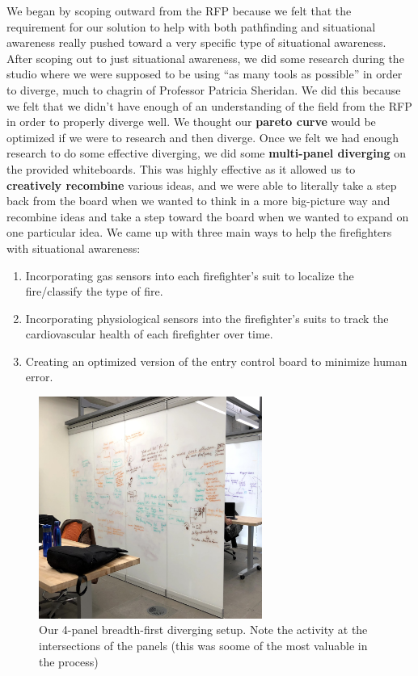\documentclass[a4paper,12pt]{article}
\begin{document}
We began by scoping outward from the RFP because we felt that the requirement for our solution to help with both pathfinding and situational awareness really pushed toward a very specific type of situational awareness. After scoping out to just situational awareness, we did some research during the studio where we were supposed to be using “as many tools as possible” in order to diverge, much to chagrin of Professor Patricia Sheridan. We did this because we felt that we didn’t have enough of an understanding of the field from the RFP in order to properly diverge well. We thought our \textbf{pareto curve} would be optimized if we were to research and then diverge. Once we felt we had enough research to do some effective diverging, we did some \textbf{multi-panel diverging} on the provided whiteboards. This was highly effective as it allowed us to \textbf{creatively recombine} various ideas, and we were able to literally take a step back from the board when we wanted to think in a more big-picture way and recombine ideas and take a step toward the board when we wanted to expand on one particular idea. We came up with three main ways to help the firefighters with situational awareness:

\begin{enumerate}
	\item Incorporating gas sensors into each firefighter’s suit to localize the fire/classify the type of fire.
	\item Incorporating physiological sensors into the firefighter’s suits to track the cardiovascular health of each firefighter over time. 
	\item Creating an optimized version of the entry control board to minimize human error.
\end{enumerate}

\begin{figure}[H]
\centering
\includegraphics[width=0.65\textwidth]{img/image014.png}
\caption{Our 4-panel breadth-first diverging setup. Note the activity at the intersections of the panels (this was soome of the most valuable in the process)}
\label{}
\end{figure}
\end{document}
